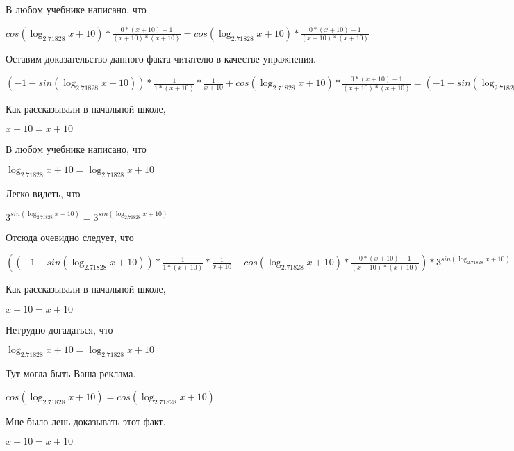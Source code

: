 \documentclass[12pt,a4paper,fleqn]{article}
\theoremstyle{definition}
\begin{document}
В любом учебнике написано, что

$cos(\log_{ 2.71828 }{ x  +  10 }) * \frac{ 0  * ( x  +  10 ) -  1 }{( x  +  10 ) * ( x  +  10 )}
 = cos(\log_{ 2.71828 }{ x  +  10 }) * \frac{ 0  * ( x  +  10 ) -  1 }{( x  +  10 ) * ( x  +  10 )}
$

Оставим доказательство данного факта читателю в качестве упражнения.

$( -1  - sin(\log_{ 2.71828 }{ x  +  10 })) * \frac{ 1 }{ 1  * ( x  +  10 )}
 * \frac{ 1 }{ x  +  10 }
 + cos(\log_{ 2.71828 }{ x  +  10 }) * \frac{ 0  * ( x  +  10 ) -  1 }{( x  +  10 ) * ( x  +  10 )}
 = ( -1  - sin(\log_{ 2.71828 }{ x  +  10 })) * \frac{ 1 }{ 1  * ( x  +  10 )}
 * \frac{ 1 }{ x  +  10 }
 + cos(\log_{ 2.71828 }{ x  +  10 }) * \frac{ 0  * ( x  +  10 ) -  1 }{( x  +  10 ) * ( x  +  10 )}
$

Как рассказывали в начальной школе,

$ x  +  10  =  x  +  10 $

В любом учебнике написано, что

$\log_{ 2.71828 }{ x  +  10 } = \log_{ 2.71828 }{ x  +  10 }$

Легко видеть, что

${ 3 }^{sin(\log_{ 2.71828 }{ x  +  10 })} = { 3 }^{sin(\log_{ 2.71828 }{ x  +  10 })}$

Отсюда очевидно следует, что

$(( -1  - sin(\log_{ 2.71828 }{ x  +  10 })) * \frac{ 1 }{ 1  * ( x  +  10 )}
 * \frac{ 1 }{ x  +  10 }
 + cos(\log_{ 2.71828 }{ x  +  10 }) * \frac{ 0  * ( x  +  10 ) -  1 }{( x  +  10 ) * ( x  +  10 )}
) * { 3 }^{sin(\log_{ 2.71828 }{ x  +  10 })} = (( -1  - sin(\log_{ 2.71828 }{ x  +  10 })) * \frac{ 1 }{ 1  * ( x  +  10 )}
 * \frac{ 1 }{ x  +  10 }
 + cos(\log_{ 2.71828 }{ x  +  10 }) * \frac{ 0  * ( x  +  10 ) -  1 }{( x  +  10 ) * ( x  +  10 )}
) * { 3 }^{sin(\log_{ 2.71828 }{ x  +  10 })}$

Как рассказывали в начальной школе,

$ x  +  10  =  x  +  10 $

Нетрудно догадаться, что

$\log_{ 2.71828 }{ x  +  10 } = \log_{ 2.71828 }{ x  +  10 }$

Тут могла быть Ваша реклама.

$cos(\log_{ 2.71828 }{ x  +  10 }) = cos(\log_{ 2.71828 }{ x  +  10 })$

Мне было лень доказывать этот факт.

$ x  +  10  =  x  +  10 $
\end{document}
